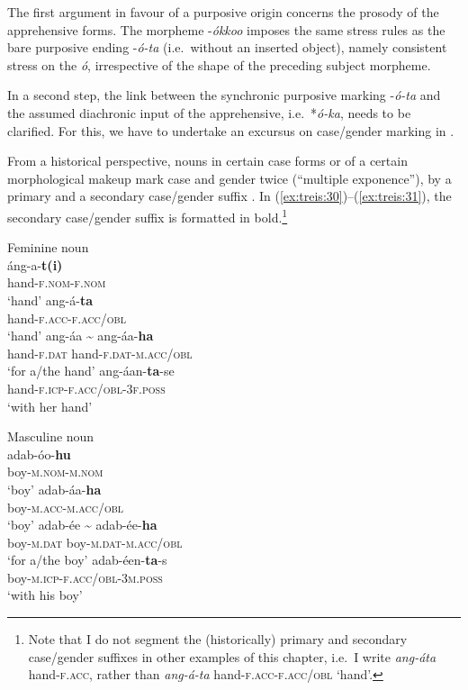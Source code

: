 \documentclass[output=paper,colorlinks,citecolor=brown,]{langscibook}
\begin{document}
The first argument in favour of a purposive origin concerns the prosody of the apprehensive forms. The morpheme \nobreakdash-\textit{ókkoo} imposes the same stress rules as the bare purposive ending \nobreakdash-\textit{ó-ta} (i.e.\ without an inserted object), namely consistent stress on the \textit{ó}, irrespective of the shape of the preceding subject morpheme.

In a second step, the link between the synchronic purposive marking \nobreakdash-\textit{ó-ta} and the assumed diachronic input of the apprehensive,  i.e.\ *\textit{ó-ka}, needs to be clarified. For this, we have to undertake an excursus on case\slash gender marking in .

From a historical perspective, nouns in certain case forms or of a certain morphological makeup mark case and gender twice (``multiple exponence''), by a primary and a secondary case\slash gender suffix \citep[100]{Treis2008}. In (\ref{ex:treis:30})--(\ref{ex:treis:31}), the secondary case\slash gender suffix is formatted in bold.\footnote{Note that I do not segment the (historically) primary and secondary case\slash gender suffixes in other examples of this chapter,  i.e.\ I write \textit{ang-áta} hand-\textsc{f.acc}, rather than \textit{ang-á-ta} hand-\textsc{f.acc-f.acc/obl} `hand'.}

\ea\label{ex:treis:30} \textnormal{Feminine noun}\\
\ea\label{ex:treis:30a}
\gll áng-a-\textbf{t(i)} \\
hand-\textsc{f.nom-f.nom}\\
\glt `hand'
\ex\label{ex:treis:30b}
\gll ang-á-\textbf{ta}\\
hand-\textsc{f.acc-f.acc/obl}\\
\glt `hand'
\ex\label{ex:treis:30c} 
\gll ang-áa		\~{}	ang-áa-\textbf{ha}\\
hand-\textsc{f.dat}	{} hand-\textsc{f.dat-m.acc/obl}\\
\glt `for a/the hand'
\ex\label{ex:treis:30d} 
\gll ang-áan-\textbf{ta}-se\\
hand-\textsc{f.icp-f.acc/obl-3f.poss}\\
\glt `with her hand'
\z 
\z 

\ea\label{ex:treis:31} \textnormal{Masculine noun}\\
\ea\label{ex:treis:31a}
\gll adab-óo-\textbf{hu}\\
boy-\textsc{m.nom-m.nom} \\
\glt `boy'
\ex\label{ex:treis:31b}
\gll adab-áa-\textbf{ha}\\
boy-\textsc{m.acc-m.acc/obl} \\
\glt `boy'
\ex\label{ex:treis:31c}
\gll adab-ée		\~{}	adab-ée-\textbf{ha}\\
boy-\textsc{m.dat}		{} boy-\textsc{m.dat-m.acc/obl}\\
\glt `for a/the boy'
\ex\label{ex:treis:31d}
\gll adab-éen-\textbf{ta}-s\\
boy-\textsc{m.icp-f.acc/obl-3m.poss}\\
\glt `with his boy'
\z 
\z 
\end{document}
